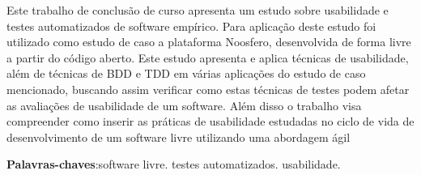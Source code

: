 \begin{resumo}

Este trabalho de conclusão de curso apresenta um estudo sobre usabilidade e testes automatizados de software empírico. Para aplicação deste estudo foi utilizado como estudo de caso a plataforma Noosfero, desenvolvida de forma livre a partir do código aberto. Este estudo apresenta e aplica técnicas de usabilidade, além de técnicas de BDD e TDD em várias aplicações do estudo de caso mencionado, buscando assim verificar como estas técnicas de testes podem afetar as avaliações de usabilidade de um software.  Além disso o trabalho visa compreender como inserir as práticas de usabilidade estudadas no ciclo de vida de desenvolvimento de um software livre utilizando uma abordagem ágil

\vspace{\onelineskip}
    
 \noindent
 \textbf{Palavras-chaves}:software livre. testes automatizados. usabilidade.

\end{resumo}
